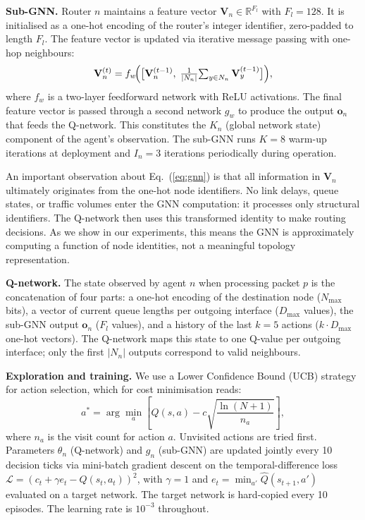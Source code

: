 \documentclass[10pt,twocolumn,letterpaper]{article}
\begin{document}
\textbf{Sub-GNN.} Router $n$ maintains a feature vector
$\mathbf{V}_n \in \mathbb{R}^{F_l}$ with $F_l = 128$. It is initialised
as a one-hot encoding of the router's integer identifier, zero-padded
to length $F_l$. The feature vector is updated via iterative
message passing with one-hop neighbours:
\begin{equation}
  \mathbf{V}_n^{(t)} = f_w\!\Bigl(
    \bigl[\mathbf{V}_n^{(t-1)},\;
    \tfrac{1}{|N_n|}\!\textstyle\sum_{y \in N_n} \mathbf{V}_y^{(t-1)}\bigr]
  \Bigr),
  \label{eq:gnn}
\end{equation}
where $f_w$ is a two-layer feedforward network with ReLU activations.
The final feature vector is passed through a second network $g_w$ to
produce the output $\mathbf{o}_n$ that feeds the Q-network. This
constitutes the $K_n$ (global network state) component of the agent's
observation. The sub-GNN runs $K = 8$ warm-up iterations at deployment
and $I_n = 3$ iterations periodically during operation.

An important observation about Eq.~(\ref{eq:gnn}) is that all
information in $\mathbf{V}_n$ ultimately originates from the one-hot
node identifiers. No link delays, queue states, or traffic volumes enter
the GNN computation: it processes only structural identifiers. The
Q-network then uses this transformed identity to make routing decisions.
As we show in our experiments, this means the GNN is approximately
computing a function of node identities, not a meaningful topology
representation.

\textbf{Q-network.} The state observed by agent $n$ when processing
packet $p$ is the concatenation of four parts: a one-hot encoding of
the destination node ($N_{\max}$ bits), a vector of current queue
lengths per outgoing interface ($D_{\max}$ values), the sub-GNN output
$\mathbf{o}_n$ ($F_l$ values), and a history of the last $k=5$ actions
($k \cdot D_{\max}$ one-hot vectors). The Q-network maps this state to
one Q-value per outgoing interface; only the first $|N_n|$ outputs
correspond to valid neighbours.

\textbf{Exploration and training.} We use a Lower Confidence Bound
(UCB) strategy for action selection, which for cost minimisation reads:
\begin{equation}
  a^* = \arg\min_a \left[Q(s,a) - c\sqrt{\frac{\ln(N+1)}{n_a}}\right],
  \label{eq:ucb}
\end{equation}
where $n_a$ is the visit count for action $a$. Unvisited actions are
tried first. Parameters $\theta_n$ (Q-network) and $g_n$ (sub-GNN) are
updated jointly every 10 decision ticks via mini-batch gradient descent
on the temporal-difference loss $\mathcal{L} = (c_t + \gamma e_t -
Q(s_t, a_t))^2$, with $\gamma = 1$ and $e_t = \min_{a'}
\hat{Q}(s_{t+1}, a')$ evaluated on a target network. The target network
is hard-copied every 10 episodes. The learning rate is $10^{-3}$
throughout.
\end{document}
